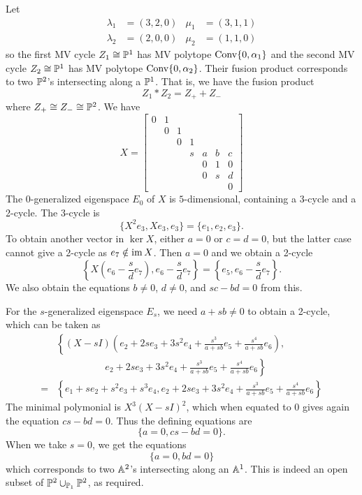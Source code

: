 \documentclass{article}
\begin{document}
\begin{example}
    Let
    \[
    \begin{aligned}
        \lambda_1 &= (3,2,0) & \mu_1 &= (3,1,1) \\
        \lambda_2 &= (2,0,0) & \mu_2 &= (1,1,0)
    \end{aligned}
    \]
    so the first MV cycle $Z_1 \cong \PP^1$ has MV polytope $\Conv\{0, \alpha_1\}$ and the second MV cycle $Z_2 \cong \PP^1$ has MV polytope $\Conv\{0, \alpha_2\}$. Their fusion product corresponds to two $\PP^2$'s intersecting along a $\PP^1$. That is, we have the fusion product
    \[
    Z_1 * Z_2 = Z_+ + Z_-
    \]
    where $Z_+ \cong Z_- \cong \PP^2$.
    We have 
    \[
    X = \begin{bmatrix}
    0 & 1 \\
      & 0 & 1 \\
      &   & 0 & 1 \\
      &   &   & s & a & b & c \\
      &   &   &   & 0 & 1 & 0 \\
      &   &   &   & 0 & s & d \\
      &   &   &   &   &   & 0
    \end{bmatrix}
    \]
    The $0$-generalized eigenspace $E_0$ of $X$ is $5$-dimensional, containing a 3-cycle and a 2-cycle.
    The 3-cycle is 
    \[
    \{X^2 e_3 , X e_3, e_3\} = \{e_1, e_2, e_3\}.
    \]
    To obtain another vector in $\ker X$, either $a = 0$ or $c = d = 0$, but the latter case cannot give a 2-cycle as $e_7 \notin \im X$. Then $a = 0$ and we obtain a 2-cycle
    \[
    \left\{X \left( e_6 -\frac{s}{d}e_7 \right), e_6 - \frac{s}{d}e_7 \right\}
    = \left\{e_5, e_6 - \frac{s}{d}e_7 \right\}.
    \]
    We also obtain the equations $b \neq 0$, $d \neq 0$, and $sc - bd = 0$ from this.
    
    For the $s$-generalized eigenspace $E_s$, we need $a + sb \neq 0$ to obtain a 2-cycle, which can be taken as 
    \[
    \begin{split}
    & \left\{ 
    (X -sI) \left( e_2 + 2s e_3 + 3s^2 e_4 + \frac{s^3}{a+sb} e_5 + \frac{s^4}{a+sb} e_6 \right), \right. \\ 
    & \quad \qquad \qquad  \left. e_2 + 2s e_3 + 3s^2 e_4 + \frac{s^3}{a+sb} e_5 + \frac{s^4}{a+sb} e_6 
    \right\} \\
    = & \left\{ 
    e_1 + s e_2 + s^2 e_3 + s^3 e_4, 
    e_2 + 2s e_3 + 3s^2 e_4 + \frac{s^3}{a+sb} e_5 + \frac{s^4}{a+sb} e_6
    \right\}
    \end{split}
    \]
    The minimal polymonial is $X^3 (X-sI)^2$, which when equated to 0 gives again the equation $cs-bd = 0$.
    Thus the defining equations are 
    \[
    \{ a = 0, cs-bd = 0\}.
    \]
    When we take $s = 0$, we get the equations
    \[
    \{a = 0, bd = 0\}
    \]
    which corresponds to two $\AA^2$'s intersecting along an $\AA^1$. This is indeed an open subset of $\PP^2 \cup_{\PP_1} \PP^2$, as required.
\end{example}
\end{document}

